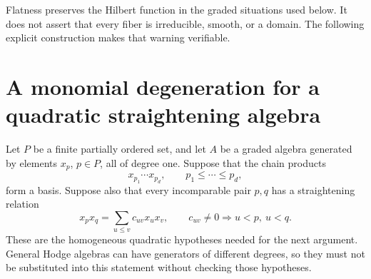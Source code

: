 Flatness preserves the Hilbert function in the
graded situations used below.  It does not
assert that every fiber is irreducible, smooth,
or a domain.  The following explicit
construction makes that warning verifiable.

\section{A monomial degeneration for a quadratic straightening algebra}

Let \(P\) be a finite partially ordered set,
and let \(A\) be a graded algebra generated
by elements \(x_p\), \(p\in P\), all of
degree one.  Suppose that the chain products
\[
 x_{p_1}\cdots x_{p_d},\qquad
                p_1\le\cdots\le p_d,
\]
form a basis.  Suppose also that every
incomparable pair \(p,q\) has a straightening
relation
\[
 x_px_q=\sum_{u\le v}c_{uv}x_ux_v,
 \qquad c_{uv}\ne0\Longrightarrow u<p,\ u<q.
 \tag{ASL}
\]
These are the homogeneous quadratic hypotheses
needed for the next argument.  General Hodge
algebras can have generators of different
degrees, so they must not be substituted
into this statement without checking those
hypotheses.

